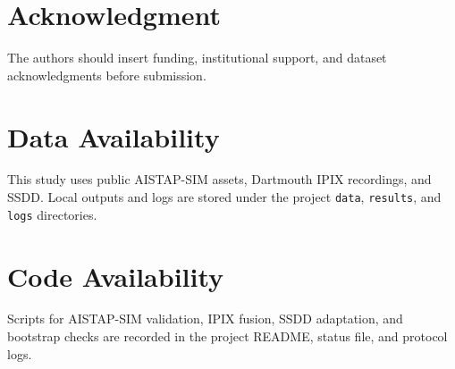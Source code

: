 \documentclass[journal]{IEEEtran}
\begin{document}
\section*{Acknowledgment}

The authors should insert funding, institutional support, and dataset acknowledgments before submission.

\section*{Data Availability}

This study uses public AISTAP-SIM assets, Dartmouth IPIX recordings, and SSDD. Local outputs and logs are stored under the project \texttt{data}, \texttt{results}, and \texttt{logs} directories.

\section*{Code Availability}

Scripts for AISTAP-SIM validation, IPIX fusion, SSDD adaptation, and bootstrap checks are recorded in the project README, status file, and protocol logs.
\end{document}
